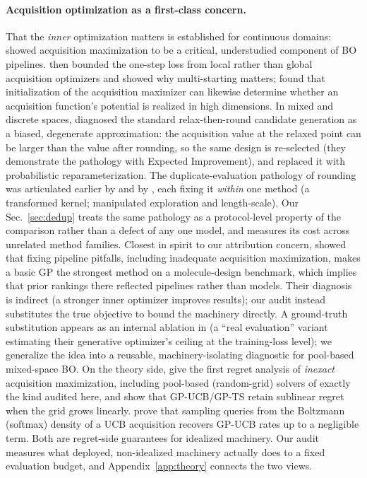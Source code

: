 \documentclass[%
 aip,
 amsmath,amssymb,
 floatfix,
 reprint,%
]{revtex4-1}
\begin{document}
\paragraph{Acquisition optimization as a first-class concern.}
That the \emph{inner} optimization matters is established for continuous
domains: \citet{wilson2018maximizing} showed acquisition maximization to
be a critical, understudied component of BO pipelines. \citet{kim2020local}
then bounded the one-step loss from local rather than global acquisition
optimizers and showed why multi-starting matters; \citet{zhao2024unleashing}
found that initialization of the acquisition maximizer can likewise determine
whether an acquisition function's potential is realized in high dimensions.
In mixed and
discrete spaces, \citet{daulton2022pr} diagnosed the standard
relax-then-round candidate generation as a biased, degenerate
approximation: the acquisition value at the relaxed point can be larger
than the value after rounding, so the same design is re-selected (they
demonstrate the pathology with Expected Improvement), and replaced it
with probabilistic reparameterization. The duplicate-evaluation
pathology of rounding was
articulated earlier by \citet{garrido2020dealing} and by
\citet{luong2019discrete}, each fixing it \emph{within} one method (a
transformed kernel; manipulated exploration and length-scale). Our
Sec.~\ref{sec:dedup} treats the same pathology as a protocol-level
property of the comparison rather than a defect of any one model, and
measures its cost across unrelated method families. Closest in spirit to
our attribution concern, \citet{tripp2024diagnosing} showed that fixing
pipeline pitfalls, including inadequate acquisition maximization, makes
a basic GP the strongest method on a molecule-design benchmark, which
implies that prior rankings there reflected pipelines rather than
models. Their diagnosis is indirect (a stronger inner optimizer improves
results); our audit instead substitutes the true objective to bound the
machinery directly. A ground-truth substitution appears as an internal
ablation in \citet{evogo2025} (a ``real evaluation'' variant estimating
their generative optimizer's ceiling at the training-loss level); we
generalize the idea into a reusable, machinery-isolating diagnostic for
pool-based mixed-space BO. On the theory side, \citet{kim2025inexact}
give the first regret analysis of \emph{inexact} acquisition
maximization, including pool-based (random-grid) solvers of exactly the
kind audited here, and show that GP-UCB/GP-TS retain sublinear regret
when the grid grows linearly. \citet{bloor2026b3o} prove that sampling
queries from the Boltzmann (softmax) density of a UCB acquisition
recovers GP-UCB rates up to a negligible term. Both are regret-side
guarantees for idealized machinery. Our audit measures what deployed,
non-idealized machinery actually does to a fixed evaluation budget, and
Appendix~\ref{app:theory} connects the two views.
\end{document}
